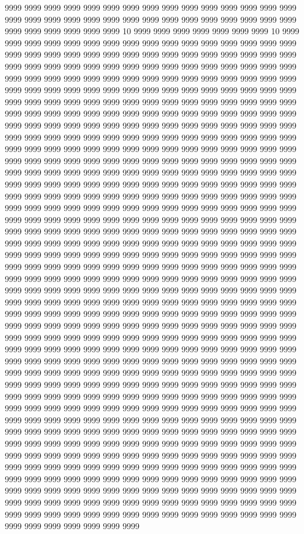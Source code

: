 9999 9999 9999 9999 9999 9999 9999 9999 9999 9999 9999 9999 9999 9999 9999 9999 9999 9999 9999 9999 9999 9999 9999 9999 9999 9999 9999 9999 9999 9999 9999 9999 9999 9999 9999 9999 10 9999 9999 9999 9999 9999 9999 9999 10 9999 9999 9999 9999 9999 9999 9999 9999 9999 9999 9999 9999 9999 9999 9999 9999 9999 9999 9999 9999 9999 9999 9999 9999 9999 9999 9999 9999 9999 9999 9999 9999 9999 9999 9999 9999 9999 9999 9999 9999 9999 9999 9999 9999 9999 9999 9999 9999 9999 9999 9999 9999 9999 9999 9999 9999 9999 9999 9999 9999 9999 9999 9999 9999 9999 9999 9999 9999 9999 9999 9999 9999 9999 9999 9999 9999 9999 9999 9999 9999 9999 9999 9999 9999 9999 9999 9999 9999 9999 9999 9999 9999 9999 9999 9999 9999 9999 9999 9999 9999 9999 9999 9999 9999 9999 9999 9999 9999 9999 9999 9999 9999 9999 9999 9999 9999 9999 9999 9999 9999 9999 9999 9999 9999 9999 9999 9999 9999 9999 9999 9999 9999 9999 9999 9999 9999 9999 9999 9999 9999 9999 9999 9999 9999 9999 9999 9999 9999 9999 9999 9999 9999 9999 9999 9999 9999 9999 9999 9999 9999 9999 9999 9999 9999 9999 9999 9999 9999 9999 9999 9999 9999 9999 9999 9999 9999 9999 9999 9999 9999 9999 9999 9999 9999 9999 9999 9999 9999 9999 9999 9999 9999 9999 9999 9999 9999 9999 9999 9999 9999 9999 9999 9999 9999 9999 9999 9999 9999 9999 9999 9999 9999 9999 9999 9999 9999 9999 9999 9999 9999 9999 9999 9999 9999 9999 9999 9999 9999 9999 9999 9999 9999 9999 9999 9999 9999 9999 9999 9999 9999 9999 9999 9999 9999 9999 9999 9999 9999 9999 9999 9999 9999 9999 9999 9999 9999 9999 9999 9999 9999 9999 9999 9999 9999 9999 9999 9999 9999 9999 9999 9999 9999 9999 9999 9999 9999 9999 9999 9999 9999 9999 9999 9999 9999 9999 9999 9999 9999 9999 9999 9999 9999 9999 9999 9999 9999 9999 9999 9999 9999 9999 9999 9999 9999 9999 9999 9999 9999 9999 9999 9999 9999 9999 9999 9999 9999 9999 9999 9999 9999 9999 9999 9999 9999 9999 9999 9999 9999 9999 9999 9999 9999 9999 9999 9999 9999 9999 9999 9999 9999 9999 9999 9999 9999 9999 9999 9999 9999 9999 9999 9999 9999 9999 9999 9999 9999 9999 9999 9999 9999 9999 9999 9999 9999 9999 9999 9999 9999 9999 9999 9999 9999 9999 9999 9999 9999 9999 9999 9999 9999 9999 9999 9999 9999 9999 9999 9999 9999 9999 9999 9999 9999 9999 9999 9999 9999 9999 9999 9999 9999 9999 9999 9999 9999 9999 9999 9999 9999 9999 9999 9999 9999 9999 9999 9999 9999 9999 9999 9999 9999 9999 9999 9999 9999 9999 9999 9999 9999 9999 9999 9999 9999 9999 9999 9999 9999 9999 9999 9999 9999 9999 9999 9999 9999 9999 9999 9999 9999 9999 9999 9999 9999 9999 9999 9999 9999 9999 9999 9999 9999 9999 9999 9999 9999 9999 9999 9999 9999 9999 9999 9999 9999 9999 9999 9999 9999 9999 9999 9999 9999 9999 9999 9999 9999 9999 9999 9999 9999 9999 9999 9999 9999 9999 9999 9999 9999 9999 9999 9999 9999 9999 9999 9999 9999 9999 9999 9999 9999 9999 9999 9999 9999 9999 9999 9999 9999 9999 9999 9999 9999 9999 9999 9999 9999 9999 9999 9999 9999 9999 9999 9999 9999 9999 9999 9999 9999 9999 9999 9999 9999 9999 9999 9999 9999 9999 9999 9999 9999 9999 9999 9999 9999 9999 9999 9999 9999 9999 9999 9999 9999 9999 9999 9999 9999 9999 9999 9999 9999 9999 9999 9999 9999 9999 9999 9999 9999 9999 9999 9999 9999 9999 9999 9999 9999 9999 9999 9999 9999 9999 9999 9999 9999 9999 9999 9999 9999 9999 9999 9999 9999 9999 9999 9999 9999 9999 9999 9999 9999 9999 9999 9999 9999 9999 9999 9999 9999 9999 9999 9999 9999 9999 9999 9999 